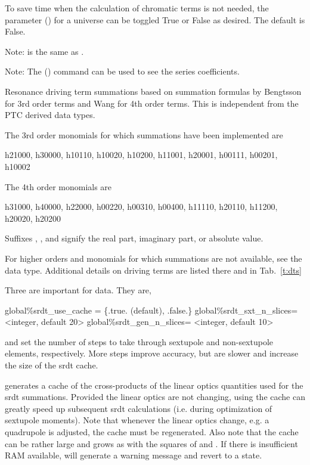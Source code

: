 \begin{description}
{{{{{{{{{To save time when the calculation of chromatic terms is not needed, the  parameter
() for a universe can be toggled True or False as desired. The default is False.

Note:  is the same as .

Note: The  () command can be used to see the series coefficients.

  \item[srdt.h<monomial>.\{r,i,a\}] \Newline {}
Resonance driving term summations based on summation formulas by Bengtsson\cite{b:bengtsson} for 3rd
order terms and Wang\cite{b:wang} for 4th order terms. This is independent from the PTC derived
 data types. 

The 3rd order monomials for which summations have been implemented are
\begin{example}
  h21000, h30000, h10110, h10020, h10200,
  h11001, h20001, h00111, h00201, 
  h10002
\end{example}

The 4th order monomials are 
\begin{example}
  h31000, h40000, h22000,
  h00220, h00310, h00400, 
  h11110, h20110, h11200, h20020, h20200
\end{example}

Suffixes , , and  signify the real part, imaginary part, or absolute value.

For higher orders and monomials for which summations are not available, see the \Newline
{} data type.  Additional details on driving terms are listed there
and in Tab.~\ref{t:dts}

Three   are important for  data.  They are,
\begin{example}
  global{\%}srdt_use_cache = \{.true. (default), .false.\}
  global{\%}srdt_sxt_n_slices= <integer, default 20>
  global{\%}srdt_gen_n_slices= <integer, default 10>
\end{example}

 and  set the number of steps to take through sextupole
and non-sextupole elements, respectively.  More steps improve accuracy, but are slower and increase
the size of the srdt cache.

 generates a cache of the cross-products of the linear optics quantities used for
the srdt summations.  Provided the linear optics are not changing, using the cache can greatly speed
up subsequent srdt calculations (i.e. during optimization of sextupole moments).  Note that whenever
the linear optics change, e.g. a quadrupole is adjusted, the cache must be regenerated.  Also note
that the cache can be rather large and grows as with the squares of  and
.  If there is insufficient RAM available,  will generate a warning
message and revert to a  state.

}}}}}}}}}
\end{description}
